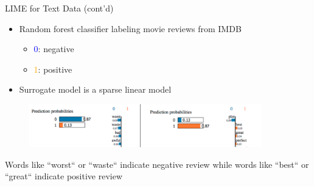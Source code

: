 \documentclass[11pt,compress,t,notes=noshow, aspectratio=169, xcolor=table]{beamer}
\begin{document}
\begin{frame}{LIME for Text Data (cont'd) }	 
	\begin{itemize}
		\item Random forest classifier labeling movie reviews from IMDB 
		\begin{itemize}
		    \item \textcolor{blue}{0}: negative
		    \item \textcolor{orange}{1}: positive
		\end{itemize}
		\item Surrogate model is a sparse linear model 
	\end{itemize}
	
	\begin{figure}
		\begin{center}
			\includegraphics[width=0.9\textwidth]{figure/lime_movier}
		\end{center}
	\end{figure}
	
	{Words like ``worst`` or ``waste`` indicate negative review while words like ``best`` or ``great`` indicate positive review}
	
	\end{frame}
	
\end{document}
